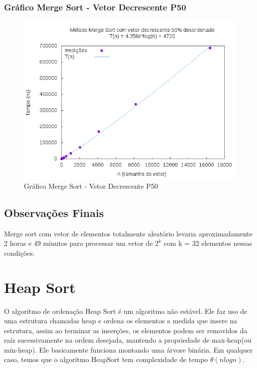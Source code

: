 \documentclass[12pt,a4paper,twoside]{report}
\begin{document}
\subsection{Gráfico Merge Sort - Vetor Decrescente P50}
\begin{figure}[H]
    \centering
    \includegraphics[width=0.7\linewidth]{graficos/MergeSort/vIntDecrescenteP50/vIntDecrescenteP50.png}
  \caption{Gráfico Merge Sort - Vetor Decrescente P50}
\end{figure}
\section{Observações Finais}
Merge sort com vetor de elementos totalmente aleatório levaria aproximadamente 2 horas e 49 minutos para processar um vetor de $2^k$ com k = 32 elementos nessas condições.

\chapter{Heap Sort}
O algoritmo de ordenação Heap Sort é um algoritmo não estável. Ele faz uso de uma estrutura chamadas heap e ordena os elementos a medida que insere na estrutura, assim ao terminar as inserções, os elementos podem ser removidos da raíz sucessivamente na ordem desejada, mantendo a propriedade de max-heap(ou min-heap).
Ele basicamente funciona montando uma árvore binária.
Em qualquer caso, temos que o algoritmo HeapSort tem complexidade de tempo $\theta(nlogn)$.
\end{document}
